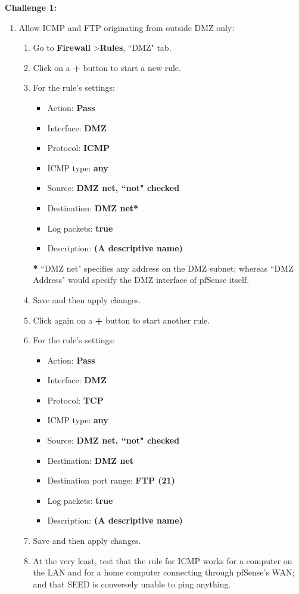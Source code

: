\documentclass[12pt]{extarticle}
\begin{document}
\textbf{Challenge 1:}
\begin{enumerate}
\item Allow ICMP and FTP originating from outside DMZ only:
\begin{enumerate}
    \item Go to \textbf{Firewall} \textgreater \textbf{Rules}, ``DMZ" tab.
    \item Click on a \textbf{+} button to start a new rule.
    \item For the rule's settings:
    \begin{itemize}
        \item Action: \textbf{Pass}
        \item Interface: \textbf{DMZ}
        \item Protocol: \textbf{ICMP}
        \item ICMP type: \textbf{any}
        \item Source: \textbf{DMZ net, ``not" checked}
        \item Destination: \textbf{DMZ net*}
        \item Log packets: \textbf{true}
        \item Description: \textbf{(A descriptive name)}
    \end{itemize}
    
    \textbf{*} ``DMZ net" specifies any address on the DMZ subnet; whereas ``DMZ Address" would specify the DMZ interface of pfSense itself.
    
    \item Save and then apply changes.

    \item Click again on a \textbf{+} button to start another rule.
    \item For the rule's settings:
    \begin{itemize}
        \item Action: \textbf{Pass}
        \item Interface: \textbf{DMZ}
        \item Protocol: \textbf{TCP}
        \item ICMP type: \textbf{any}
        \item Source: \textbf{DMZ net, ``not" checked}
        \item Destination: \textbf{DMZ net}
        \item Destination port range: \textbf{FTP (21)}
        \item Log packets: \textbf{true}
        \item Description: \textbf{(A descriptive name)}
    \end{itemize}
    \item Save and then apply changes.
    \item At the very least, test that the rule for ICMP works for a computer on the LAN and for a home computer connecting through pfSense's WAN; and that SEED is conversely unable to ping anything.
\end{enumerate}


\end{enumerate}
\end{document}

